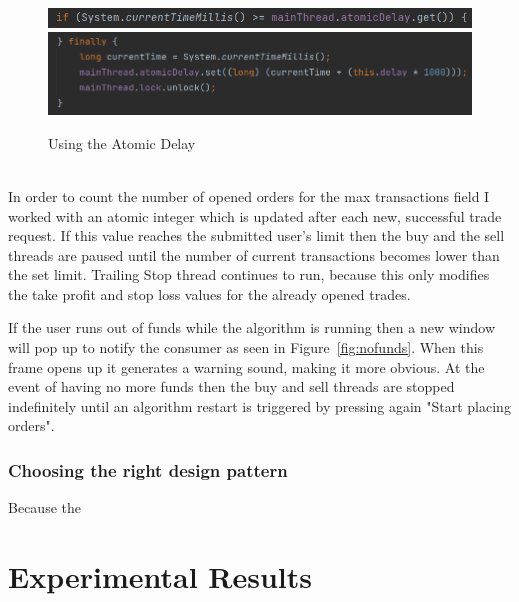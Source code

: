 \documentclass[12pt,a4paper]{report}
\begin{document}
\begin{figure}[!ht]
	\centering
	\includegraphics[scale=0.7]{pics/delay1.png}
	\includegraphics[scale=0.7]{pics/delay2.png}
	\caption{Using the Atomic Delay}
	\label{fig:delay}
\end{figure}
\\
In order to count the number of opened orders for the max transactions field I worked with an atomic integer which is updated after each new, successful trade request. If this value reaches the submitted user's limit then the buy and the sell threads are paused until the number of current transactions becomes lower than the set limit. Trailing Stop thread continues to run, because this only modifies the take profit and stop loss values for the already opened trades.

If the user runs out of funds while the algorithm is running then a new window will pop up to notify the consumer as seen in Figure~\ref{fig:nofunds}. When this frame opens up it generates a warning sound, making it more obvious. At the event of having no more funds then the buy and sell threads are stopped indefinitely until an algorithm restart is triggered by pressing again "Start placing orders".  

\subsection{Choosing the right design pattern}
Because the 

\chapter{Experimental Results}
\end{document}

